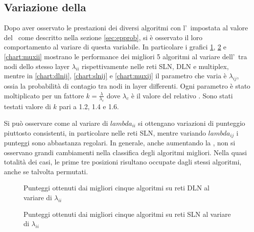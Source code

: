 




\subsection{Variazione della \epprob}

Dopo aver osservato le prestazioni dei diversi algoritmi con l'\epprob\ impostata al valore del \crepp\ come 
descritto nella sezione \vref{sec:epprob}, si è osservato il loro comportamento al variare di questa variabile.
In particolare i grafici \ref{chart:dlnii}, \ref{chart:slnii} e \ref{chart:muxii} mostrano le performance dei 
migliori 5 algoritmi al variare dell'\epprob\ tra nodi dello stesso layer $\lambda_{ii}$ rispettivamente nelle 
reti SLN, DLN e multiplex, mentre in \ref{chart:dlnij}, \ref{chart:slnij} e \ref{chart:muxij} il parametro che varia è $\lambda_{ij}$, ossia
la probabilità di contagio tra nodi in layer differenti.
Ogni parametro è stato moltiplicato per un fattore $k = \frac{\lambda}{\lambda_c}$ dove $\lambda_c$ è il valore del relativo \crepp.
Sono stati testati valore di $k$ pari a \num{1.2}, \num{1.4} e \num{1.6}.

Si può osservare come al variare di $lambda_{ii}$ si ottengano variazioni di punteggio piuttosto consistenti, in particolare nelle 
reti SLN, mentre variando $lambda_{ij}$ i punteggi sono abbastanza regolari.
In generale, anche aumentando la \epprob, non si osservano grandi cambiamenti nella classifica degli algoritmi migliori.
Nella quasi totalità dei casi, le prime tre posizioni risultano occupate dagli stessi algoritmi, anche se talvolta 
permutati. 


\begin{figure}
    \centering
    \resizebox{\textwidth}{!}{}
    
    \caption{Punteggi ottenuti dai migliori cinque algoritmi su reti DLN al variare di $\lambda_{ii}$}
    \label{chart:dlnii}
\end{figure}

\begin{figure}
    \centering
    \resizebox{\textwidth}{!}{}
    
    \caption{Punteggi ottenuti dai migliori cinque algoritmi su reti SLN al variare di $\lambda_{ii}$}
    \label{chart:slnii}
\end{figure}

